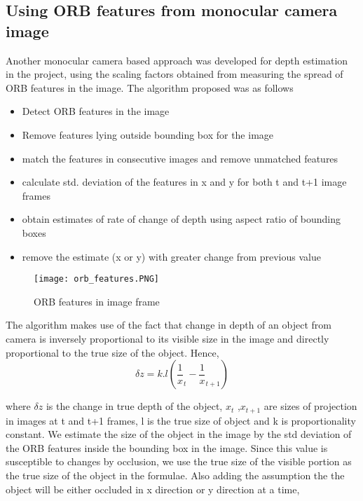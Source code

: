 	\subsection{Using ORB features from monocular camera image}
	Another monocular camera based approach was developed for depth estimation in the project, using the scaling factors obtained from measuring the spread of ORB features in the image. The algorithm proposed was as follows
	
	\begin{itemize}
		\item Detect ORB features in the image
		\item Remove features lying outside bounding box for the image
		\item match the features in consecutive images and remove unmatched features
		\item calculate std. deviation of the features in x and y for
		both t and t+1 image frames
		\item obtain estimates of rate of change of depth using
		aspect ratio of bounding boxes
		\item remove the estimate (x or y) with greater change
		from previous value
	\end{itemize}
	
	\begin{figure}[htbp]
		\centering
		\texttt{[image: orb\_features.PNG]}
		\caption{ORB features in image frame\label{ROS working}}
	\end{figure}
	
	The algorithm makes use of the fact that change in depth of an object from camera is inversely proportional to its visible size in the image and directly proportional to the true size of the object. Hence,
	\begin{equation}\delta{z} = k.l(\frac{1}{x}_{t} - \frac{1}{x}_{t+1}) \end{equation}
	
	where $\delta{z}$ is the change in true depth of the object, ${x}_{t}$ ,${x}_{t+1}$ are sizes of projection in images at t and t+1 frames, l is the true size of object and k is proportionality constant. We estimate the size of the object in the image by the std deviation of the ORB features inside the bounding box in the image. Since this value is susceptible to changes by occlusion, we use the true size of the visible portion as the true size of the object in the formulae. Also adding the assumption the the object will be either occluded in x direction or y direction at a time,
	
